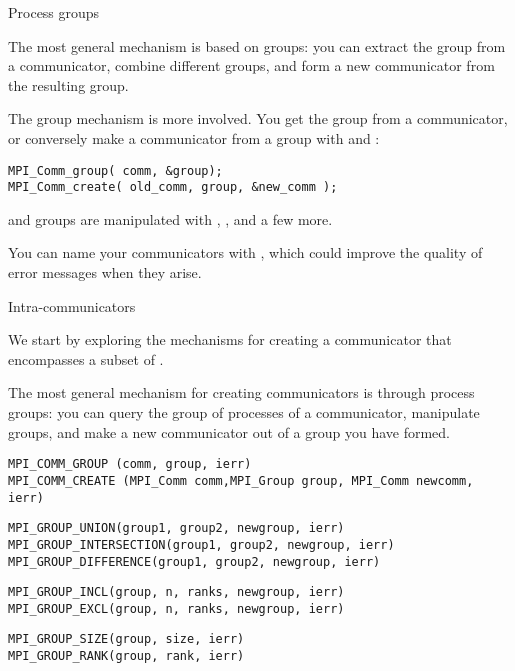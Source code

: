  {Process groups}

The most general mechanism is based on groups: you can extract the
group from a communicator, combine different groups, and form a new
communicator from the resulting group.

The group mechanism is more involved. You get the group from a
communicator, or conversely make a communicator from a group with
 and :
\begin{verbatim}
MPI_Comm_group( comm, &group);
MPI_Comm_create( old_comm, group, &new_comm );
\end{verbatim}
and groups are manipulated with
, ,
 and a few more.

You can name your communicators with , which
could improve the quality of error messages when they arise.

 {Intra-communicators}
\label{sec:comm-group}

We start by exploring the mechanisms for creating a communicator that
encompasses a subset of . 

The most general mechanism for creating communicators is through
process groups: you can query the group of processes of a
communicator, manipulate groups, and make a new communicator out of a
group you have formed.

\begin{verbatim}
MPI_COMM_GROUP (comm, group, ierr)
MPI_COMM_CREATE (MPI_Comm comm,MPI_Group group, MPI_Comm newcomm, ierr)
\end{verbatim}

\begin{verbatim}
MPI_GROUP_UNION(group1, group2, newgroup, ierr)
MPI_GROUP_INTERSECTION(group1, group2, newgroup, ierr)
MPI_GROUP_DIFFERENCE(group1, group2, newgroup, ierr)
\end{verbatim}

\begin{verbatim}
MPI_GROUP_INCL(group, n, ranks, newgroup, ierr)
MPI_GROUP_EXCL(group, n, ranks, newgroup, ierr)
\end{verbatim}
\begin{verbatim}
MPI_GROUP_SIZE(group, size, ierr)
MPI_GROUP_RANK(group, rank, ierr)
\end{verbatim}

